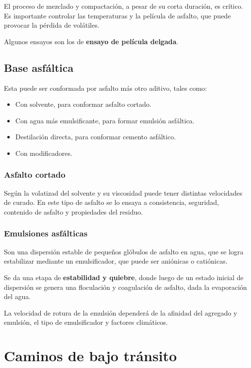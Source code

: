 \documentclass[../main.tex]{subfiles}
\begin{document}
El proceso de mezclado y compactación, a pesar de su corta duración, es crítico.
Es importante controlar las temperaturas y la película de asfalto, que puede
provocar la pérdida de volátiles.

Algunos ensayos son los de \textbf{ensayo de película delgada}.

\subsection{Base asfáltica}

Esta puede ser conformada por asfalto más otro aditivo, tales como:

\begin{itemize}
  \item Con solvente, para conformar asfalto cortado.
  \item Con agua más emulsificante, para formar emulsión asfáltica.
  \item Destilación directa, para conformar cemento asfáltico.
  \item Con modificadores.
\end{itemize}

\subsubsection{Asfalto cortado}

Según la volatizad del solvente y su viscosidad puede tener distintas 
velocidades de curado. En este tipo de asfalto se lo ensaya a consistencia,
seguridad, contenido de asfalto y propiedades del residuo.

\subsubsection{Emulsiones asfálticas}

Son una dispersión estable de pequeños glóbulos de asfalto en agua, que se 
logra estabilizar mediante un emulsificador, que puede ser aniónicas o
catiónicas.

Se da una etapa de \textbf{estabilidad y quiebre}, donde luego de un estado
inicial de dispersión se genera una floculación y coagulación de asfalto, dada
la evaporación del agua.

La velocidad de rotura de la emulsión dependerá de la afinidad del agregado y
emulsión, el tipo de emulsificador y factores climáticos.

\section{Caminos de bajo tránsito}
\end{document}
